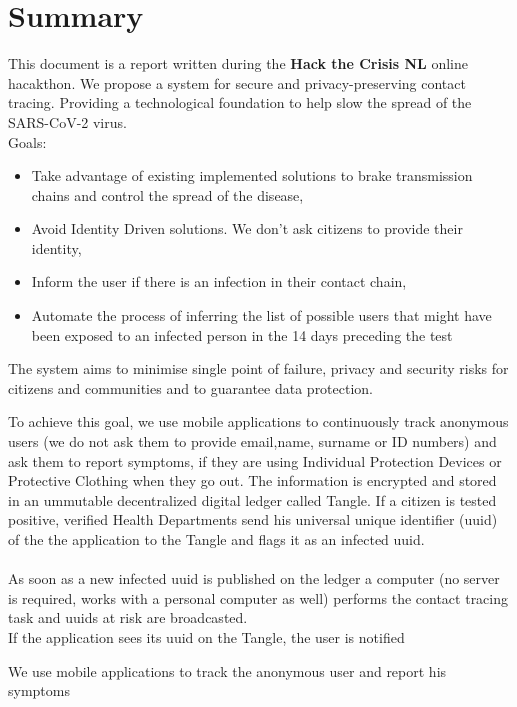 {\color{PineGreen}\section{Summary}}

This document is a report written during the \textbf{Hack the Crisis NL} online hacakthon\cite{bib1}. We propose a system for secure and privacy-preserving contact tracing. Providing a technological foundation to help slow the spread of the SARS-CoV-2 virus.\\

Goals:
\begin{itemize}
\item Take advantage of existing implemented solutions to brake transmission chains and control the spread of the disease,
\item Avoid Identity Driven solutions. We don't ask citizens to provide their identity,
\item Inform the user if there is an infection in their contact chain,
\item Automate the process of inferring the list of possible users that might have been exposed to an infected person in the 14 days preceding the test
\end{itemize} 

The system aims to minimise single point of failure, privacy and security risks for citizens and communities and to guarantee data protection.

To achieve this goal, we use mobile applications to continuously track anonymous users (we do not ask them to provide email,name, surname or ID numbers) and ask them to report symptoms, if they are using Individual Protection Devices or Protective Clothing when they go out. The information is encrypted and stored in an ummutable decentralized digital ledger called Tangle. If a citizen is tested positive, verified Health Departments send his universal unique identifier (uuid) of the the application to the Tangle and flags it as an infected uuid. \\
\\
As soon as a new infected uuid is published on the ledger a computer (no server is required, works with a personal computer as well) performs the contact tracing task and uuids at risk are broadcasted.\\
If the application sees its uuid on the Tangle, the user is notified


We use mobile applications to track the anonymous user and report his symptoms

